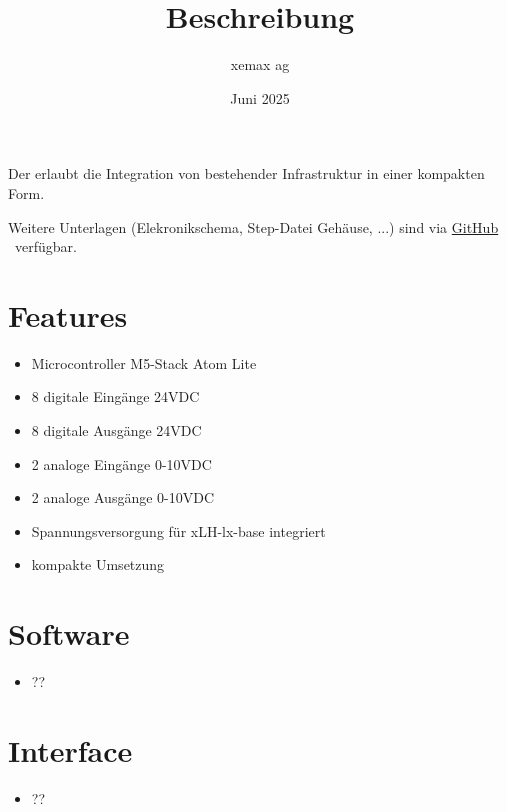 \documentclass[10pt]{datasheet}
\title{Beschreibung \xlhPlattformID}
\author{xemax ag}
\date{Juni 2025}
\begin{document}
\maketitle



Der \xlhPlattformID erlaubt die Integration von bestehender Infrastruktur in einer kompakten Form.

Weitere Unterlagen (Elekronikschema, Step-Datei Gehäuse, ...) sind via
\href{https://github.com/xemax-ag/xLH/}{GitHub \xlhPlattformID}\ verfügbar.

\section{Features}

\begin{itemize}
    \item Microcontroller M5-Stack Atom Lite
    \item 8 digitale Eingänge 24VDC
    \item 8 digitale Ausgänge 24VDC
    \item 2 analoge Eingänge 0-10VDC
    \item 2 analoge Ausgänge 0-10VDC
    \item Spannungsversorgung für xLH-lx-base integriert
    \item kompakte Umsetzung
\end{itemize}

\section{Software}

\begin{itemize}
    \item ??
\end{itemize}

\section{Interface}

\begin{itemize}
    \item ??
\end{itemize}

\vfill\break
\end{document}
